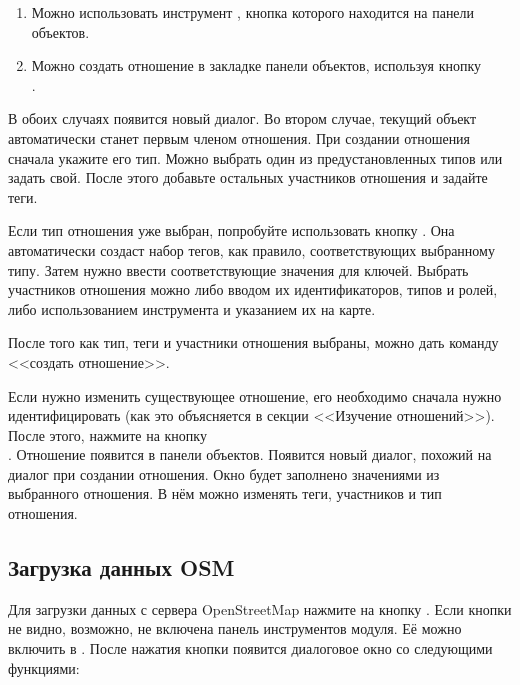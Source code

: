 \begin{enumerate}
\item Можно использовать инструмент
, кнопка которого
находится на панели объектов.
\item Можно создать отношение в закладке  панели объектов,
используя кнопку \\
.
\end{enumerate}

В обоих случаях появится новый диалог. Во втором случае, текущий объект
автоматически станет первым членом отношения. При создании отношения
сначала укажите его тип. Можно выбрать один из предустановленных типов
или задать свой. После этого добавьте остальных участников отношения
и задайте теги.

Если тип отношения уже выбран, попробуйте использовать кнопку
. Она автоматически
создаст набор тегов, как правило, соответствующих выбранному типу. Затем
нужно ввести соответствующие значения для ключей. Выбрать участников
отношения можно либо вводом их идентификаторов, типов и ролей, либо
использованием инструмента 
и указанием их на карте.

После того как тип, теги и участники отношения выбраны, можно дать
команду <<создать отношение>>.


Если нужно изменить существующее отношение, его необходимо сначала нужно
идентифицировать (как это объясняется в секции <<Изучение отношений>>).
После этого, нажмите на кнопку \\
. Отношение
появится в панели объектов. Появится новый диалог, похожий на диалог
при создании отношения. Окно будет заполнено значениями из
выбранного отношения. В нём можно изменять теги, участников и тип
отношения.

\subsection{Загрузка данных OSM}

Для загрузки данных с сервера OpenStreetMap нажмите на кнопку
. Если кнопки не видно,
возможно, не включена панель инструментов модуля. Её можно включить
в  \arrow {} \arrow
{}.
После нажатия кнопки появится диалоговое окно со следующими функциями:

